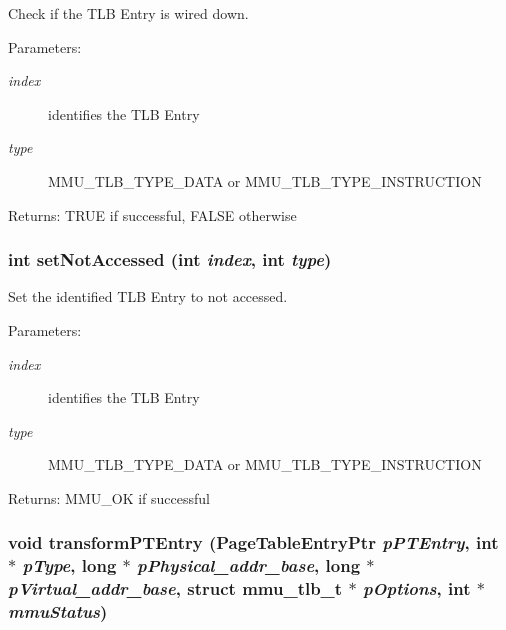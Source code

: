 Check if the TLB Entry is wired down. \begin{Desc}
\item[Parameters:]
\begin{description}
\item[{\em index}]identifies the TLB Entry \item[{\em type}]MMU\_\-TLB\_\-TYPE\_\-DATA or MMU\_\-TLB\_\-TYPE\_\-INSTRUCTION \end{description}
\end{Desc}
\begin{Desc}
\item[Returns:]TRUE if successful, FALSE otherwise \end{Desc}
\hypertarget{group___v_m_m___t_l_b_g2cd5a0e8e26579c35da589d5a35a3567}{
\subsubsection[{setNotAccessed}]{\setlength{\rightskip}{0pt plus 5cm}int setNotAccessed (int {\em index}, \/  int {\em type})}}
\label{group___v_m_m___t_l_b_g2cd5a0e8e26579c35da589d5a35a3567}


Set the identified TLB Entry to not accessed. \begin{Desc}
\item[Parameters:]
\begin{description}
\item[{\em index}]identifies the TLB Entry \item[{\em type}]MMU\_\-TLB\_\-TYPE\_\-DATA or MMU\_\-TLB\_\-TYPE\_\-INSTRUCTION \end{description}
\end{Desc}
\begin{Desc}
\item[Returns:]MMU\_\-OK if successful \end{Desc}
\hypertarget{group___v_m_m___t_l_b_gfc514c7439830f42ce18cb81ac95d4db}{
\subsubsection[{transformPTEntry}]{\setlength{\rightskip}{0pt plus 5cm}void transformPTEntry ({\bf PageTableEntryPtr} {\em pPTEntry}, \/  int $\ast$ {\em pType}, \/  long $\ast$ {\em pPhysical\_\-addr\_\-base}, \/  long $\ast$ {\em pVirtual\_\-addr\_\-base}, \/  struct {\bf mmu\_\-tlb\_\-t} $\ast$ {\em pOptions}, \/  int $\ast$ {\em mmuStatus})}}
\label{group___v_m_m___t_l_b_gfc514c7439830f42ce18cb81ac95d4db}


